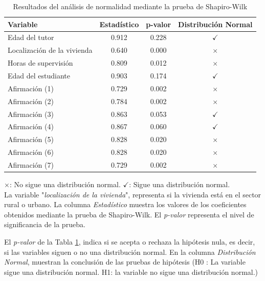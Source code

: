 \documentclass[a4paper,fleqn]{cas-sc}
\begin{document}
					\begin{table}[h!]
						\centering
						\caption{Resultados del análisis de normalidad mediante la prueba de Shapiro-Wilk}
						\begin{tabularx}{0.75\textwidth}{Xccc}
							\toprule
							\textbf{Variable} & \textbf{Estadístico} &  \textbf{p-valor} & \textbf{Distribución Normal} \\
							\midrule
							Edad del tutor & 0.912 & 0.228 & \(\checkmark\) \\
							Localización de la vivienda & 0.640 & 0.000 & \(\times\) \\
							Horas de supervisión & 0.809 & 0.012 & \(\times\) \\
							Edad del estudiante & 0.903 & 0.174 & \(\checkmark\) \\
							Afirmación (1) & 0.729 & 0.002 & \(\times\) \\
							Afirmación (2) & 0.784 & 0.002 & \(\times\) \\
							Afirmación (3) & 0.863 & 0.053 & \(\checkmark\) \\
							Afirmación (4) & 0.867 & 0.060 & \(\checkmark\) \\
							Afirmación (5) & 0.828 & 0.020 & \(\times\) \\
							Afirmación (6) & 0.828 & 0.020 & \(\times\) \\
							Afirmación (7) & 0.729 & 0.002 & \(\times\) \\
							\bottomrule
						\end{tabularx}
						\label{table:Shaphiro-Wilk}
						\vspace{0.3em} %
						\parbox{0.75\textwidth}{\footnotesize \centering
							\(\times\): No sigue una distribución normal. \(\checkmark\): Sigue una distribución normal.\\
							La variable "\textit{localización de la vivienda}", representa si la vivienda está en el sector rural o urbano. La columna \textit{Estadístico} muestra los valores de los coeficientes obtenidos mediante la prueba de Shapiro-Wilk. El \textit{p-valor} representa el nivel de significancia de la prueba.
						}
					\end{table}
					
					El \textit{p-valor} de la Tabla \ref{table:Shaphiro-Wilk}, indica si se acepta o rechaza la hipótesis nula, es decir, si las variables siguen o no una distribución normal. En la columna \textit{Distribución Normal}, muestran la conclusión de las pruebas de hipótesis (H0 : La variable sigue una distribución normal. H1: la variable no sigue una distribución normal.)
					
\end{document}
